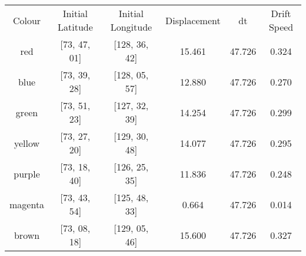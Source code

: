 \begin{tabular}{c|c c c c c}
    Colour & Initial Latitude & Initial Longitude &Displacement & dt & Drift Speed \\
    red & [73, 47, 01] & [128, 36, 42] & 15.461 & 47.726 & 0.324\\
    blue & [73, 39, 28] & [128, 05, 57] & 12.880 & 47.726 & 0.270\\
    green & [73, 51, 23] & [127, 32, 39] & 14.254 & 47.726 & 0.299\\
    yellow & [73, 27, 20] & [129, 30, 48] & 14.077 & 47.726 & 0.295\\
    purple & [73, 18, 40] & [126, 25, 35] & 11.836 & 47.726 & 0.248\\
    magenta & [73, 43, 54] & [125, 48, 33] & 0.664 & 47.726 & 0.014\\
    brown & [73, 08, 18] & [129, 05, 46] & 15.600 & 47.726 & 0.327
\end{tabular}